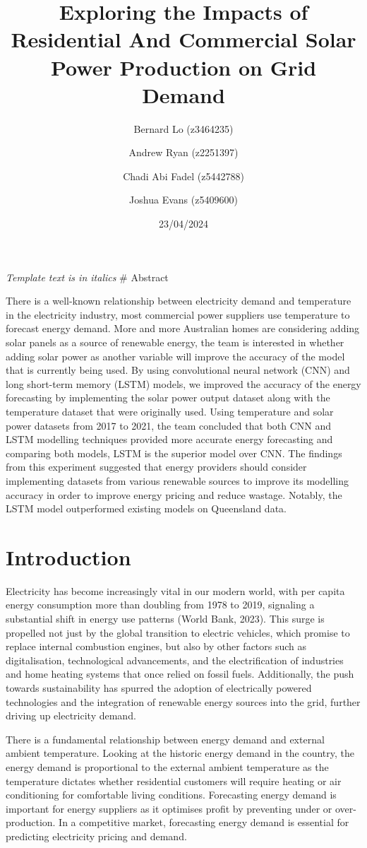 \documentclass[
]{article}
\title{Exploring the Impacts of Residential And Commercial Solar Power
Production on Grid Demand}
\author{Bernard Lo (z3464235) \and Andrew Ryan (z2251397) \and Chadi Abi
Fadel (z5442788) \and Joshua Evans (z5409600)}
\date{23/04/2024}
\begin{document}
\maketitle

{
\setcounter{tocdepth}{2}
\tableofcontents
}
\emph{Template text is in italics} \# Abstract

There is a well-known relationship between electricity demand and
temperature in the electricity industry, most commercial power suppliers
use temperature to forecast energy demand. More and more Australian
homes are considering adding solar panels as a source of renewable
energy, the team is interested in whether adding solar power as another
variable will improve the accuracy of the model that is currently being
used. By using convolutional neural network (CNN) and long short-term
memory (LSTM) models, we improved the accuracy of the energy forecasting
by implementing the solar power output dataset along with the
temperature dataset that were originally used. Using temperature and
solar power datasets from 2017 to 2021, the team concluded that both CNN
and LSTM modelling techniques provided more accurate energy forecasting
and comparing both models, LSTM is the superior model over CNN. The
findings from this experiment suggested that energy providers should
consider implementing datasets from various renewable sources to improve
its modelling accuracy in order to improve energy pricing and reduce
wastage. Notably, the LSTM model outperformed existing models on
Queensland data.

\section{Introduction}\label{introduction}

Electricity has become increasingly vital in our modern world, with per
capita energy consumption more than doubling from 1978 to 2019,
signaling a substantial shift in energy use patterns (World Bank, 2023).
This surge is propelled not just by the global transition to electric
vehicles, which promise to replace internal combustion engines, but also
by other factors such as digitalisation, technological advancements, and
the electrification of industries and home heating systems that once
relied on fossil fuels. Additionally, the push towards sustainability
has spurred the adoption of electrically powered technologies and the
integration of renewable energy sources into the grid, further driving
up electricity demand.

There is a fundamental relationship between energy demand and external
ambient temperature. Looking at the historic energy demand in the
country, the energy demand is proportional to the external ambient
temperature as the temperature dictates whether residential customers
will require heating or air conditioning for comfortable living
conditions. Forecasting energy demand is important for energy suppliers
as it optimises profit by preventing under or over-production. In a
competitive market, forecasting energy demand is essential for
predicting electricity pricing and demand.
\end{document}
